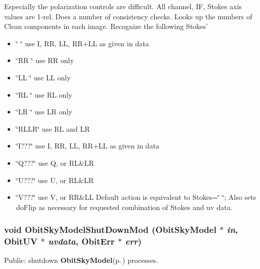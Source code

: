 Especially the polarization controls are difficult. All channel, IF, Stokes axis values are 1-rel. Does a number of consistency checks. Looks up the numbers of Clean components in each image. Recognize the following Stokes' \begin{itemize}
\item \char`\"{}    \char`\"{} use I, RR, LL, RR+LL as given in data \item \char`\"{}RR  \char`\"{} use RR only \item \char`\"{}LL  \char`\"{} use LL only \item \char`\"{}RL  \char`\"{} use RL only \item \char`\"{}LR  \char`\"{} use LR only \item \char`\"{}RLLR\char`\"{} use RL and LR \item \char`\"{}I???\char`\"{} use I, RR, LL, RR+LL as given in data \item \char`\"{}Q???\char`\"{} use Q, or RL\&LR \item \char`\"{}U???\char`\"{} use U, or RL\&LR \item \char`\"{}V???\char`\"{} use V, or RR\&LL Default action is equivalent to Stokes=\char`\"{} \char`\"{}; Also sets do\-Flip as necessary for requested combination of Stokes and uv data. 
\end{itemize}
\subsubsection{\setlength{\rightskip}{0pt plus 5cm}void Obit\-Sky\-Model\-Shut\-Down\-Mod ({\bf Obit\-Sky\-Model} $\ast$ {\em in}, {\bf Obit\-UV} $\ast$ {\em uvdata}, {\bf Obit\-Err} $\ast$ {\em err})}\label{ObitSkyModel_8h_a52}


Public: shutdown {\bf Obit\-Sky\-Model}{\rm (p.\,\pageref{structObitSkyModel})} processes. 

